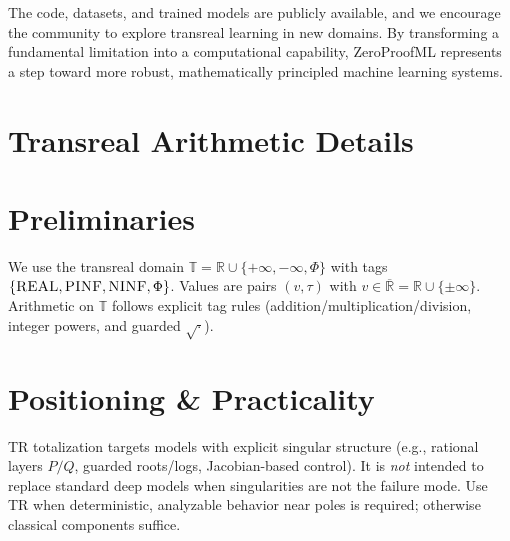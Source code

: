 \documentclass[twoside,11pt]{article}
\newcommand{\TR}{\mathbb{T}}
\newcommand{\RR}{\mathbb{R}}
\newcommand{\trReal}{\textsc{REAL}}
\newcommand{\trPINF}{\textsc{PINF}}
\newcommand{\trNINF}{\textsc{NINF}}
\newcommand{\trPHI}{\textsc{$\Phi$}}
\newcommand{\TAGREAL}{\trReal}
\newcommand{\TAGPINF}{\trPINF}
\newcommand{\TAGNINF}{\trNINF}
\newcommand{\TAGPHI}{\trPHI}
\begin{document}
The code, datasets, and trained models are publicly available, and we encourage the community to explore transreal learning in new domains. By transforming a fundamental limitation into a computational capability, ZeroProofML represents a step toward more robust, mathematically principled machine learning systems.





\appendix
\section{Transreal Arithmetic Details}\label{app:transreal}
\begingroup
\small

\section*{Preliminaries}
\label{sec:prelim}
We use the transreal domain $\TR=\RR\cup\{+\infty,-\infty,\Phi\}$ with tags $\{\TAGREAL,\TAGPINF,\TAGNINF,\TAGPHI\}$. Values are pairs $(v,\tau)$ with $v\in\overline{\RR}=\RR\cup\{\pm\infty\}$. Arithmetic on $\TR$ follows explicit tag rules (addition/multiplication/division, integer powers, and guarded $\sqrt{\cdot}$).

\section*{Positioning \& Practicality}
\label{sec:positioning}
TR totalization targets models with explicit singular structure (e.g., rational layers \(P/Q\), guarded roots/logs, Jacobian-based control). It is \emph{not} intended to replace standard deep models when singularities are not the failure mode. Use TR when deterministic, analyzable behavior near poles is required; otherwise classical components suffice.

\end{document}
